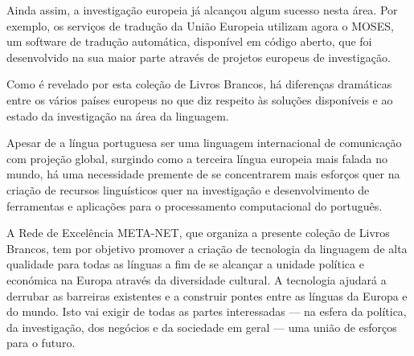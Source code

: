 \begin{multicols}{2}
Ainda assim, a investigação europeia já alcançou algum sucesso nesta área. Por exemplo, os serviços de tradução da União Europeia utilizam agora o MOSES, 
um software de tradução automática, disponível em código aberto, que foi desenvolvido na sua maior parte através de projetos europeus de investigação. 

Como é revelado por esta coleção de Livros Brancos, há  di\-fe\-ren\-ças dramáticas entre os vários países europeus no que diz respeito às soluções disponíveis e ao estado da investigação na área da linguagem. 

Apesar de a língua portuguesa ser uma linguagem internacional de comunicação
com projeção global, surgindo como a terceira língua europeia mais falada no mundo, 
há uma necessidade premente de se concentrarem mais esforços quer 
na criação de recursos linguísticos quer na investigação e desenvolvimento de ferramentas
e aplicações para o processamento computacional do português.

A Rede de Excelência META-NET, que organiza a presente coleção de Livros Brancos, tem por objetivo promover a criação de tecnologia da linguagem de alta qualidade para todas as línguas a fim de se alcançar a unidade política e económica na Europa através da diversidade cultural. A tecnologia ajudará a derrubar as barreiras existentes e a construir pontes entre as línguas da Europa e do mundo. 
Isto vai exigir de todas as partes interessadas --- na esfera da política, da investigação, dos negócios e da sociedade em geral --- uma união de esforços para o futuro.

\end{multicols}

\clearpage



